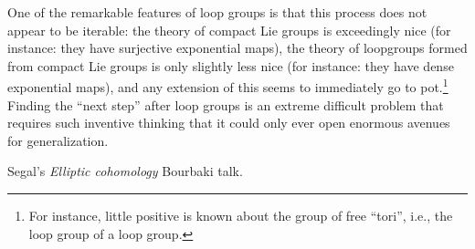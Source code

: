 One of the remarkable features of loop groups is that this process does not appear to be iterable: the theory of compact Lie groups is exceedingly nice (for instance: they have surjective exponential maps), the theory of loopgroups formed from compact Lie groups is only slightly less nice (for instance: they have dense exponential maps), and any extension of this seems to immediately go to pot.\footnote{For instance, little positive is known about the group of free ``tori'', i.e., the loop group of a loop group.}  Finding the ``next step'' after loop groups is an extreme difficult problem that requires such inventive thinking that it could only ever open enormous avenues for generalization.

Segal's \textit{Elliptic cohomology} Bourbaki talk.








